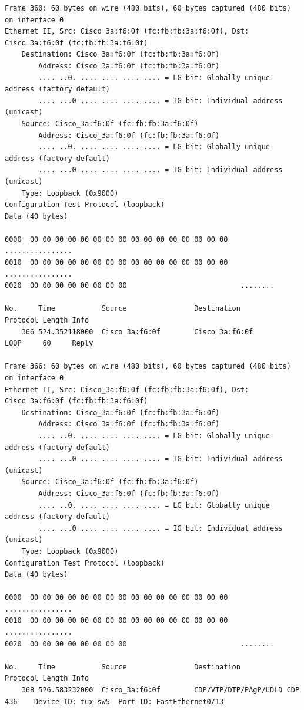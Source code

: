 \documentclass[a4paper,11pt]{article}
\begin{document}
\begin{lstlisting}
Frame 360: 60 bytes on wire (480 bits), 60 bytes captured (480 bits) on interface 0
Ethernet II, Src: Cisco_3a:f6:0f (fc:fb:fb:3a:f6:0f), Dst: Cisco_3a:f6:0f (fc:fb:fb:3a:f6:0f)
    Destination: Cisco_3a:f6:0f (fc:fb:fb:3a:f6:0f)
        Address: Cisco_3a:f6:0f (fc:fb:fb:3a:f6:0f)
        .... ..0. .... .... .... .... = LG bit: Globally unique address (factory default)
        .... ...0 .... .... .... .... = IG bit: Individual address (unicast)
    Source: Cisco_3a:f6:0f (fc:fb:fb:3a:f6:0f)
        Address: Cisco_3a:f6:0f (fc:fb:fb:3a:f6:0f)
        .... ..0. .... .... .... .... = LG bit: Globally unique address (factory default)
        .... ...0 .... .... .... .... = IG bit: Individual address (unicast)
    Type: Loopback (0x9000)
Configuration Test Protocol (loopback)
Data (40 bytes)

0000  00 00 00 00 00 00 00 00 00 00 00 00 00 00 00 00   ................
0010  00 00 00 00 00 00 00 00 00 00 00 00 00 00 00 00   ................
0020  00 00 00 00 00 00 00 00                           ........

No.     Time           Source                Destination           Protocol Length Info
    366 524.352118000  Cisco_3a:f6:0f        Cisco_3a:f6:0f        LOOP     60     Reply

Frame 366: 60 bytes on wire (480 bits), 60 bytes captured (480 bits) on interface 0
Ethernet II, Src: Cisco_3a:f6:0f (fc:fb:fb:3a:f6:0f), Dst: Cisco_3a:f6:0f (fc:fb:fb:3a:f6:0f)
    Destination: Cisco_3a:f6:0f (fc:fb:fb:3a:f6:0f)
        Address: Cisco_3a:f6:0f (fc:fb:fb:3a:f6:0f)
        .... ..0. .... .... .... .... = LG bit: Globally unique address (factory default)
        .... ...0 .... .... .... .... = IG bit: Individual address (unicast)
    Source: Cisco_3a:f6:0f (fc:fb:fb:3a:f6:0f)
        Address: Cisco_3a:f6:0f (fc:fb:fb:3a:f6:0f)
        .... ..0. .... .... .... .... = LG bit: Globally unique address (factory default)
        .... ...0 .... .... .... .... = IG bit: Individual address (unicast)
    Type: Loopback (0x9000)
Configuration Test Protocol (loopback)
Data (40 bytes)

0000  00 00 00 00 00 00 00 00 00 00 00 00 00 00 00 00   ................
0010  00 00 00 00 00 00 00 00 00 00 00 00 00 00 00 00   ................
0020  00 00 00 00 00 00 00 00                           ........

No.     Time           Source                Destination           Protocol Length Info
    368 526.583232000  Cisco_3a:f6:0f        CDP/VTP/DTP/PAgP/UDLD CDP      436    Device ID: tux-sw5  Port ID: FastEthernet0/13  


\end{lstlisting}
\end{document}
